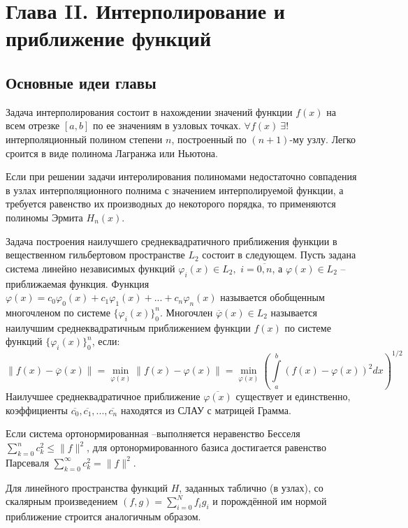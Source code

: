 \newpage
{}
\pagestyle{empty}
\vspace{0.5cm}

\section*{Глава II. Интерполирование и приближение функций}

\subsection{Основные идеи главы} 

Задача интерполирования состоит в нахождении значений функции $f(x)$
на всем отрезке $[a,b]$ по ее значениям в узловых точках. $\forall f(x)~\exists!$ интерполяционный полином степени $n$, построенный по $(n+1)$-му узлу. Легко сроится в виде полинома Лагранжа или Ньютона.

Если при решении задачи интеролирования полиномами недостаточно совпадения в узлах интерполяционного полнима с значением интерполируемой функции, а требуется равенство их производных до некоторого порядка, то применяются полиномы Эрмита $H_n (x)$.

Задача построения наилучшего среднеквадратичного приближения функции в вещественном гильбертовом пространстве $L_2$ состоит в следующем. Пусть задана система линейно независимых функций $\varphi_i(x) \in L_2,$ $i=\overline{0,n}$, а $\varphi(x) \in L_2$ -- приближаемая функция. Функция $\varphi(x) = c_0\varphi_0(x) + c_1\varphi_1(x) + ... + c_n\varphi_n(x)$ называется обобщенным многочленом по системе $\{\varphi_i(x)\}_0^n$. Многочлен $\overline{\varphi}(x) \in L_2$ называется наилучшим среднеквадратичным приближением функции $f(x)$ по системе функций $\{\varphi_i(x)\}_0^n$, если:
$$
    \|f(x)-\overline{\varphi}(x)\|=\min\limits_{\varphi(x)}{\|f(x)-
    \varphi(x)\|}=\min\limits_{\varphi(x)}{\left(\int\limits_a^b
    {\left(f(x)-\varphi(x)\right)^2dx}\right)^{1/2}}
$$
Наилучшее среднеквадратичное приближение $\overline{\varphi(x)}$ существует и единственно, коэффициенты $\overline{c_0}, \overline{c_1}, ..., \overline{c_n}$ находятся из СЛАУ с матрицей Грамма.

Если система ортонормированная –выполняется неравенство Бесселя $\sum_{k=0}^n c_k^2 \leqslant \|f\|^2$, для ортонормированного базиса достигается равенство Парсеваля $\sum_{k=0}^\infty c_k^2 = \|f\|^2.$

Для линейного пространства функций $H$, заданных таблично (в узлах),  со скалярным произведением $(f,g) = \sum\limits_{i=0}^N f_i g_i$ и порождённой им нормой приближение строится аналогичным образом.

